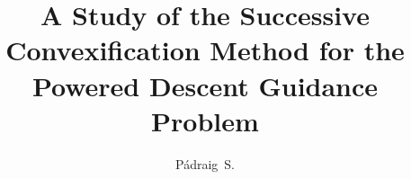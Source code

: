 \documentclass[defaultstyle,11pt]{thesis}
\title{A Study of the Successive Convexification Method for the Powered Descent Guidance Problem}
\author{Pádraig~S.}{Lysandrou}
\begin{document}




\nocite{*}		%

\appendix


\end{document}
